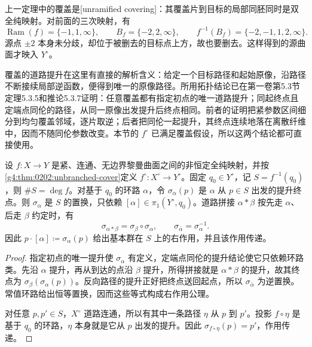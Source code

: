 上一定理中的覆盖是[unramified covering]：其覆盖片到目标的局部同胚同时是双全纯映射。对前面的三次映射，有
\[
	\operatorname{Ram}(f)=\{-1,1,\infty\},\qquad B_f=\{-2,2,\infty\},
	\qquad f^{-1}(B_f)=\{-2,-1,1,2,\infty\}.
\]
源点 \(\pm2\) 本身未分歧，却位于被删去的目标点上方，故也要删去。这样得到的源曲面才映入 \(Y^\circ\)。

\ProseParagraphBreak

覆盖的道路提升在这里有直接的解析含义：给定一个目标路径和起始原像，沿路径不断接续局部逆函数，便得到唯一的原像路径。所用拓扑结论已在第一卷第5.3节定理5.3.5和推论5.3.7证明：任意覆盖都有指定初点的唯一道路提升；同起终点且定端点同伦的路径，从同一原像出发提升后终点相同。前者的证明把紧参数区间细分到均匀覆盖邻域，逐片取逆；后者把同伦一起提升，其终点连续地落在离散纤维中，因而不随同伦参数改变。本节的 \(f^\circ\) 已满足覆盖假设，所以这两个结论都可直接使用。

\begin{proposition}\label{g4:prop:0202:monodromy}
	设 \(f:X\rightarrow Y\) 是紧、连通、无边界黎曼曲面之间的非恒定全纯映射，并按\cref{g4:thm:0202:unbranched-cover}定义 \(f^\circ:X^\circ\rightarrow Y^\circ\)。固定 \(q_0\in Y^\circ\)，记 \(S=f^{-1}(q_0)\)，则 \(\#S=\deg f\)。对基于 \(q_0\) 的环路 \(\alpha\)，令 \(\sigma_\alpha(p)\) 是 \(\alpha\) 从 \(p\in S\) 出发的提升终点。则 \(\sigma_\alpha\) 是 \(S\) 的置换，只依赖 \([\alpha]\in\pi_1(Y^\circ,q_0)\)。道路拼接 \(\alpha*\beta\) 按先走 \(\alpha\)、后走 \(\beta\) 约定时，有
	\begin{equation}\label{g4:eq:0202:monodromy-order}
		\sigma_{\alpha*\beta}=\sigma_\beta\circ\sigma_\alpha,
		\qquad \sigma_{\bar\alpha}=\sigma_\alpha^{-1}.
	\end{equation}
	因此 \(p\cdot[\alpha]\coloneqq\sigma_\alpha(p)\) 给出基本群在 \(S\) 上的右作用，并且该作用传递。
\end{proposition}
\begin{proof}
	指定初点的唯一提升使 \(\sigma_\alpha\) 有定义，定端点同伦的提升结论使它只依赖环路类。先沿 \(\alpha\) 提升，再从到达的点沿 \(\beta\) 提升，所得拼接就是 \(\alpha*\beta\) 的提升，故其终点为 \(\sigma_\beta(\sigma_\alpha(p))\)。反向路径的提升正好把终点送回起点，所以 \(\sigma_{\bar\alpha}\) 为逆置换。常值环路给出恒等置换，因而这些等式构成右作用公理。

	对任意 \(p,p'\in S\)，\(X^\circ\) 道路连通，所以有其中一条路径 \(\eta\) 从 \(p\) 到 \(p'\)。投影 \(f\circ\eta\) 是基于 \(q_0\) 的环路，\(\eta\) 本身就是它从 \(p\) 出发的提升。因此 \(\sigma_{f\circ\eta}(p)=p'\)，作用传递。
\end{proof}

